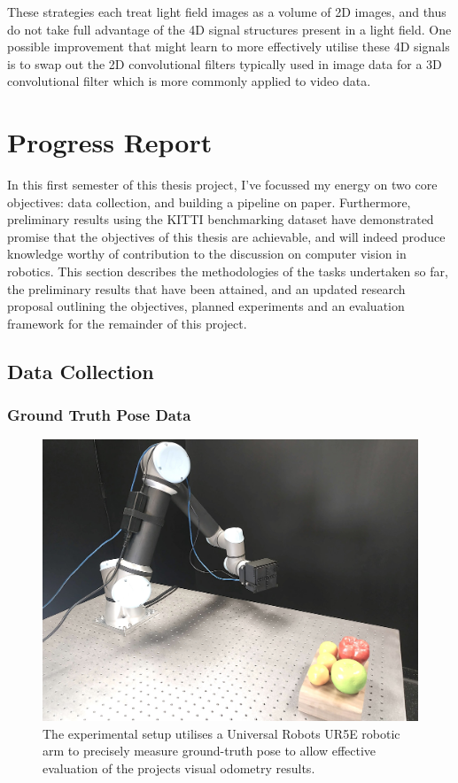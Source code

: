\documentclass[openany]{book}
\begin{document}
These strategies each treat light field images as a volume of 2D images, and thus do not take full advantage of the 4D signal structures present in a light field. One possible improvement that might learn to more effectively utilise these 4D signals is to swap out the 2D convolutional filters typically used in image data for a 3D convolutional filter which is more commonly applied to video data. 


\chapter{Progress Report}

In this first semester of this thesis project, I've focussed my energy on two core objectives: data collection, and building a pipeline on paper. Furthermore, preliminary results using the KITTI benchmarking dataset have demonstrated promise that the objectives of this thesis are achievable, and will indeed produce knowledge worthy of contribution to the discussion on computer vision in robotics. This section describes the methodologies of the tasks undertaken so far, the preliminary results that have been attained, and an updated research proposal outlining the objectives, planned experiments and an evaluation framework for the remainder of this project.

\section{Data Collection}

\subsection{Ground Truth Pose Data}

\begin{figure}[h]
    \centering 
    \includegraphics[width=4.5in]{images/experimentalsetup2.jpg}
    \caption{The experimental setup utilises a Universal Robots UR5E robotic arm to precisely measure ground-truth pose to allow effective evaluation of the projects visual odometry results.}
\end{figure}
\end{document}
